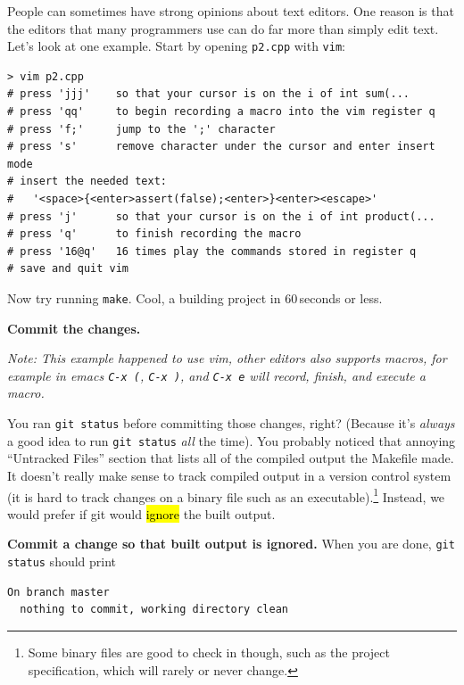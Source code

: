 \documentclass{article}
\begin{document}
\medskip
\noindent
People can sometimes have strong opinions about text editors. One reason is
that the editors that many programmers use can do far more than simply edit
text.  Let's look at one example. Start by opening \texttt{p2.cpp} with
\texttt{vim}:\\
\begin{lstlisting}
> vim p2.cpp
# press 'jjj'    so that your cursor is on the i of int sum(...
# press 'qq'     to begin recording a macro into the vim register q
# press 'f;'     jump to the ';' character
# press 's'      remove character under the cursor and enter insert mode
# insert the needed text:
#   '<space>{<enter>assert(false);<enter>}<enter><escape>'
# press 'j'      so that your cursor is on the i of int product(...
# press 'q'      to finish recording the macro
# press '16@q'   16 times play the commands stored in register q
# save and quit vim
\end{lstlisting}
\noindent

\noindent
Now try running \texttt{make}. Cool, a building project in 60\,seconds or less.

\medskip
\noindent
\textbf{Commit the changes.}

\medskip
\noindent
{\small\emph{%
Note: This example happened to use vim, other editors also supports
macros, for example in emacs \texttt{C-x~(}, \texttt{C-x~)}, and
\texttt{C-x~e} will record, finish, and execute a macro.
}}

\newpage

\medskip
\noindent
You ran \texttt{git status} before committing those changes, right? (Because
it's \emph{always} a good idea to run \texttt{git status} \emph{all} the time).
You probably noticed that annoying ``Untracked Files'' section that
lists all of the compiled output the Makefile made. It doesn't really make
sense to track compiled output in a version control system (it is hard to
track changes on a binary file such as an executable).\footnote{%
  Some binary files are good to check in though, such as the project
  specification, which will rarely or never change.
}
Instead, we would prefer if git would \hl{ignore} the built output.

\medskip
\noindent
\textbf{Commit a change so that built output is ignored.} When you are done,
\texttt{git status} should print
\begin{Verbatim}[fontsize=\footnotesize]
  On branch master
  nothing to commit, working directory clean
\end{Verbatim}
\end{document}
